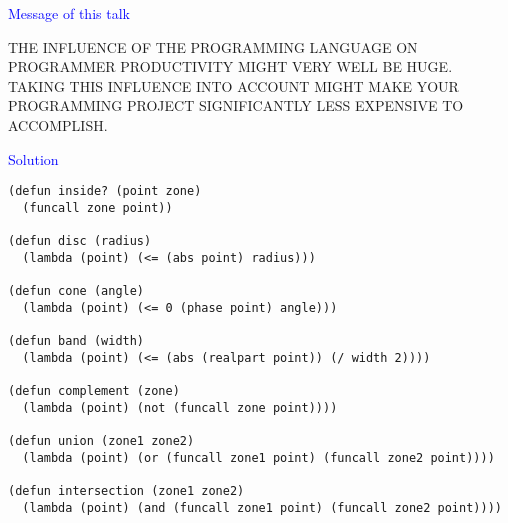 \documentclass{slides}
\newcommand{\ti}[1]{\begin{center}\Large{\textcolor{blue}{#1}}\end{center}}
\begin{document}
\begin{slide}\ti{Message of this talk}

THE INFLUENCE OF THE PROGRAMMING LANGUAGE ON PROGRAMMER PRODUCTIVITY
MIGHT VERY WELL BE HUGE.  TAKING THIS INFLUENCE INTO ACCOUNT MIGHT
MAKE YOUR PROGRAMMING PROJECT SIGNIFICANTLY LESS EXPENSIVE TO
ACCOMPLISH.

\vfill\end{slide}
\begin{slide}\ti{Solution}

{\small\begin{verbatim}
(defun inside? (point zone)
  (funcall zone point))

(defun disc (radius)
  (lambda (point) (<= (abs point) radius)))

(defun cone (angle)
  (lambda (point) (<= 0 (phase point) angle)))

(defun band (width)
  (lambda (point) (<= (abs (realpart point)) (/ width 2))))

(defun complement (zone)
  (lambda (point) (not (funcall zone point))))

(defun union (zone1 zone2)
  (lambda (point) (or (funcall zone1 point) (funcall zone2 point))))

(defun intersection (zone1 zone2)
  (lambda (point) (and (funcall zone1 point) (funcall zone2 point))))
\end{verbatim}
}

\vfill\end{slide}


\end{document}
